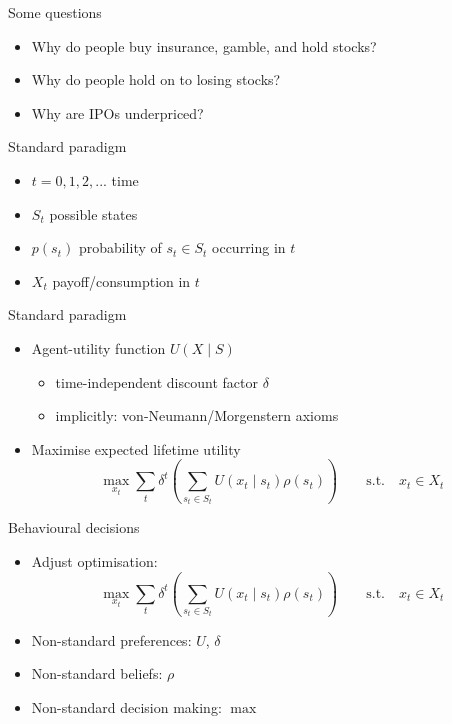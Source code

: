 \documentclass[11pt, aspectratio=169]{beamer}
\begin{document}
\begin{frame}{Some questions}
    \begin{itemize}
        \item Why do people buy insurance, gamble, and hold stocks?\bigskip
        \item Why do people hold on to losing stocks?\bigskip
        \item Why are IPOs underpriced?\bigskip
    \end{itemize}
\end{frame}

\begin{frame}{Standard paradigm}
    \begin{itemize}
        \item $t= 0,1,2,...$ time\bigskip
        \item $S_t$ possible states\bigskip
        \item $p(s_t)$ probability of $s_t \in S_t$ occurring in $t$\bigskip
        \item $X_t$ payoff/consumption in $t$\bigskip
    \end{itemize}
\end{frame}

\begin{frame}{Standard paradigm}
\begin{itemize}
    \item Agent-utility function $U(X\mid S)$\medskip
    \begin{itemize}
\item time-independent discount factor $\delta $\medskip
\item implicitly: von-Neumann/Morgenstern axioms\medskip
\end{itemize}\bigskip

    \item Maximise expected lifetime utility\medskip
	\[\max_{x_t} \sum_t  \delta^t \left(\sum_{s_t \in S_t} U(x_t \mid s_t)\rho (s_t) \right) \qquad \text{s.t.} \quad x_t \in X_t\]
   \end{itemize}
\end{frame}


\begin{frame}{Behavioural decisions}
\begin{itemize}
\item Adjust optimisation:
	\[\max_{x_t} \sum_t  \delta^t \left(\sum_{s_t \in S_t} U(x_t \mid s_t)\rho (s_t) \right) \qquad \text{s.t.} \quad x_t \in X_t\]\bigskip
        \item Non-standard preferences: $U$, $\delta $\bigskip
        \item Non-standard beliefs: $\rho$\bigskip
        \item Non-standard decision making: $\max$\bigskip
\end{itemize}
\end{frame}
\end{document}
